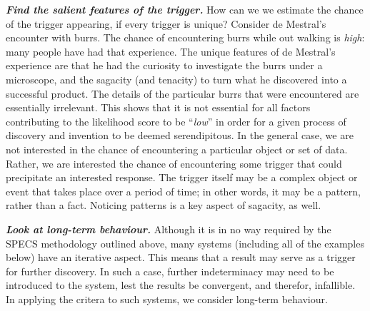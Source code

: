 \textbf{\emph{Find the salient features of the trigger.}} How can we
we estimate the chance of the trigger appearing, if every trigger is
unique?  Consider de Mestral's encounter with burrs.  The chance of
encountering burrs while out walking is \emph{high}: many people have
had that experience.  The unique features of de Mestral's experience
are that he had the curiosity to investigate the burrs under a
microscope, and the sagacity (and tenacity) to turn what he discovered
into a successful product.  The details of the particular burrs that
were encountered are essentially irrelevant.  This shows that it is
not essential for all factors contributing to the likelihood score to
be ``\emph{low}'' in order for a given process of discovery and
invention to be deemed serendipitous.  In the general case, we are not
interested in the chance of encountering a particular object or set of
data.  Rather, we are interested the chance of encountering some
trigger that could precipitate an interested response.  The trigger
itself may be a complex object or event that takes place over a period
of time; in other words, it may be a pattern, rather than a fact.
Noticing patterns is a key aspect of sagacity, as well.

\textbf{\emph{Look at long-term behaviour.}}  Although it is in no way
required by the SPECS methodology outlined above, many systems
(including all of the examples below) have an iterative aspect.  This
means that a result may serve as a trigger for further discovery.  In
such a case, further indeterminacy may need to be introduced to the
system, lest the results be convergent, and therefor, infallible.  In
applying the critera to such systems, we consider long-term behaviour.


